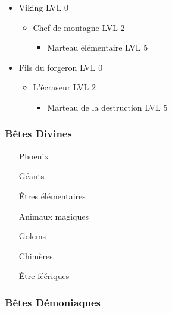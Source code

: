 \begin{itemize}
\begin{itemize}
			\item Viking LVL 0
				\begin{itemize}
					\item Chef de montagne LVL 2
						\begin{itemize}
							\item Marteau élémentaire LVL 5
						\end{itemize}
				\end{itemize}
			\item Fils du forgeron LVL 0
				\begin{itemize}
					\item L'écraseur LVL 2
						\begin{itemize}
							\item Marteau de la destruction LVL 5
						\end{itemize}
				\end{itemize}
		\end{itemize}
\end{itemize}

\subsubsection{Bêtes Divines} 

\begin{itemize}
	\item[Phoenix]
	\item[Géants]
	\item[Êtres élémentaires]
	\item[Animaux magiques]
	\item[Golems]
	\item[Chimères]
	\item[Être féériques]
\end{itemize}

\subsubsection{Bêtes Démoniaques}

